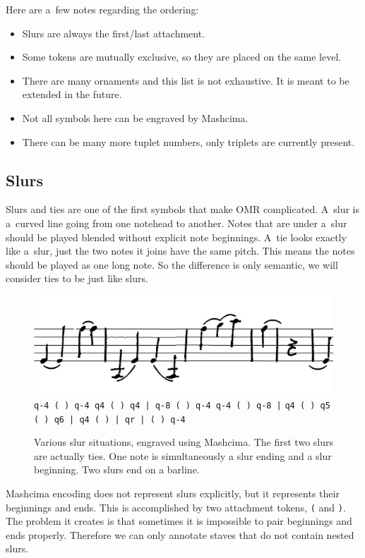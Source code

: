 Here are a~few notes regarding the ordering:

\begin{itemize}
\item Slurs are always the first/last attachment.
\item Some tokens are mutually exclusive, so they are placed on the same level.
\item There are many ornaments and this list is not exhaustive. It is meant to be extended in the future.
\item Not all symbols here can be engraved by Mashcima.
\item There can be many more tuplet numbers, only triplets are currently present.
\end{itemize}


\subsection{Slurs}
\label{sec:RepresentationSlurs}

Slurs and ties are one of the first symbols that make OMR complicated. A~slur is a~curved line going from one notehead to another. Notes that are under a~slur should be played blended without explicit note beginnings. A~tie looks exactly like a~slur, just the two notes it joins have the same pitch. This means the notes should be played as one long note. So the difference is only semantic, we will consider ties to be just like slurs.

\begin{figure}[h]
    \centering
    \includegraphics[width=140mm]{../img/slurs}
    \verb`q-4 ( ) q-4 q4 ( ) q4 | q-8 ( ) q-4 q-4 ( ) q-8 |`
    \verb`q4 ( ) q5 ( ) q6 | q4 ( ) | qr | ( ) q-4`
    \caption{Various slur situations, engraved using Mashcima. The first two slurs are actually ties. One note is simultaneously a slur ending and a slur beginning. Two slurs end on a barline.}
    \label{fig4:Slurs}
\end{figure}

Mashcima encoding does not represent slurs explicitly, but it represents their beginnings and ends. This is accomplished by two attachment tokens, \verb`(` and \verb`)`. The problem it creates is that sometimes it is impossible to pair beginnings and ends properly. Therefore we can only annotate staves that do not contain nested slurs.

